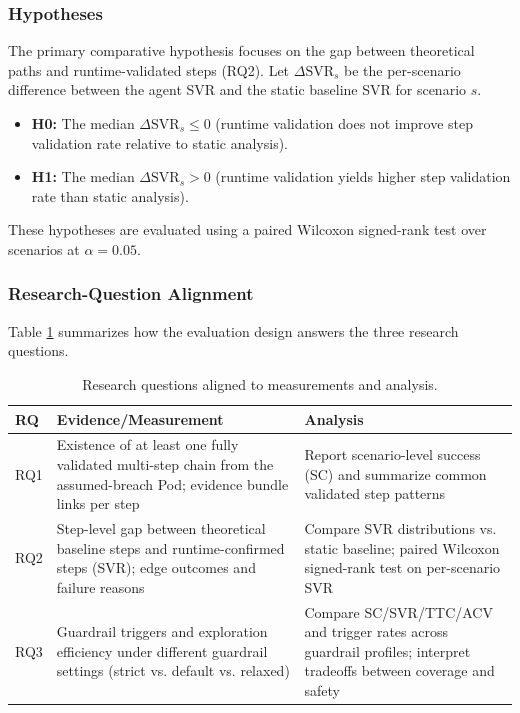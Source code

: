 \documentclass[conference]{IEEEtran}
\begin{document}
\subsubsection{Hypotheses}
The primary comparative hypothesis focuses on the gap between theoretical paths and runtime-validated steps (RQ2). Let $\Delta \text{SVR}_s$ be the per-scenario difference between the agent SVR and the static baseline SVR for scenario $s$.
\begin{itemize}
    \item \textbf{H0:} The median $\Delta \text{SVR}_s \leq 0$ (runtime validation does not improve step validation rate relative to static analysis).
    \item \textbf{H1:} The median $\Delta \text{SVR}_s > 0$ (runtime validation yields higher step validation rate than static analysis).
\end{itemize}
These hypotheses are evaluated using a paired Wilcoxon signed-rank test over scenarios at $\alpha = 0.05$.

\subsubsection{Research-Question Alignment}
Table \ref{tab:rq_alignment} summarizes how the evaluation design answers the three research questions.

\begin{table}[t!]
\centering
\caption{Research questions aligned to measurements and analysis.}
\label{tab:rq_alignment}
\scriptsize
\setlength{\tabcolsep}{6pt}
\renewcommand{\arraystretch}{1.2}
\begin{tabularx}{\textwidth}{l X X}
\toprule
\textbf{RQ} & \textbf{Evidence/Measurement} & \textbf{Analysis} \\
\midrule
RQ1 & Existence of at least one fully validated multi-step chain from the assumed-breach Pod; evidence bundle links per step & Report scenario-level success (SC) and summarize common validated step patterns \\
RQ2 & Step-level gap between theoretical baseline steps and runtime-confirmed steps (SVR); edge outcomes and failure reasons & Compare SVR distributions vs. static baseline; paired Wilcoxon signed-rank test on per-scenario SVR \\
RQ3 & Guardrail triggers and exploration efficiency under different guardrail settings (strict vs. default vs. relaxed) & Compare SC/SVR/TTC/ACV and trigger rates across guardrail profiles; interpret tradeoffs between coverage and safety \\
\bottomrule
\end{tabularx}
\end{table}
\end{document}
